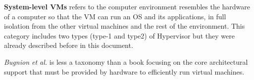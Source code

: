     \textbf{System-level VMs} refers to the computer environment resembles the hardware of a computer so that the VM can run an OS and its applications, in full isolation from the other virtual machines and the rest of the environment.  This category includes two types (type-1 and type2) of Hypervisor but they were already described before in this document.
    
    \textit{Bugnion et al.} is less a taxonomy than a book focusing on the core architectural support that must be provided by hardware to efficiently run virtual machines.
	
	
